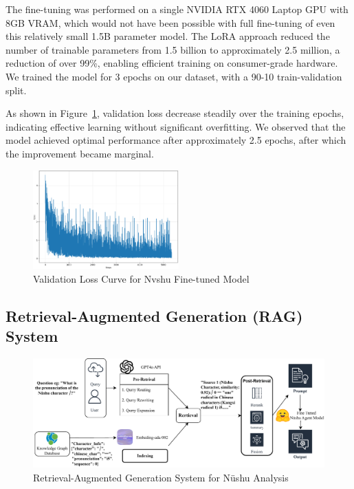 \documentclass{article}
\begin{document}
The fine-tuning was performed on a single NVIDIA RTX 4060 Laptop GPU with 8GB VRAM, which would not have been possible with full fine-tuning of even this relatively small 1.5B parameter model. The LoRA approach reduced the number of trainable parameters from 1.5 billion to approximately 2.5 million, a reduction of over 99\%, enabling efficient training on consumer-grade hardware. We trained the model for 3 epochs on our dataset, with a 90-10 train-validation split.

As shown in Figure~\ref{fig:loss_curve}, validation loss decrease steadily over the training epochs, indicating effective learning without significant overfitting. 
We observed that the model achieved optimal performance after approximately 2.5 epochs, after which the improvement became marginal.

\begin{figure}[htb]
\centering
\includegraphics[width=0.5\textwidth]{images/loss_curve.png}
\caption{Validation Loss Curve for Nvshu Fine-tuned Model}
\label{fig:loss_curve}
\end{figure}


\subsection{Retrieval-Augmented Generation (RAG) System}
\label{ssec:rag_system}    
\begin{figure}[htb]
    \centering
    \includegraphics[width=\textwidth]{images/nvshu_system_rag.drawio.pdf}
    \caption{Retrieval-Augmented Generation System for N\"{u}shu Analysis}
    \label{fig:nvshu_rag_system}
    \end{figure}
\end{document}
